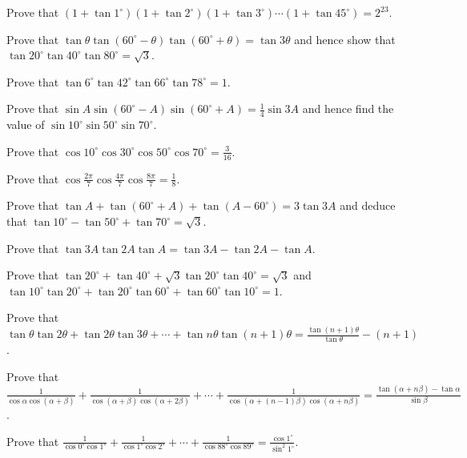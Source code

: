 \item Prove that $(1 + \tan 1^\circ)(1 + \tan 2^\circ)(1 + \tan 3^\circ)\cdots(1 + \tan 45^\circ) = 2^{23}$.

\item Prove that $\tan\theta\tan(60^\circ - \theta)\tan(60^\circ + \theta) = \tan 3\theta$ and hence show that $\tan
    20^\circ\tan 40^\circ\tan 80^\circ = \sqrt{3}$.

\item Prove that $\tan 6^\circ\tan 42^\circ\tan 66^\circ\tan 78^\circ = 1$.

\item Prove that $\sin A\sin(60^\circ - A)\sin(60^\circ + A) = \frac{1}{4}\sin 3A$ and hence find the value of $\sin
    10^\circ\sin 50^\circ\sin 70^\circ$.

\item Prove that $\cos 10^\circ\cos 30^\circ\cos 50^\circ\cos 70^\circ = \frac{3}{16}$.

\item Prove that $\cos\frac{2\pi}{7}\cos\frac{4\pi}{7}\cos\frac{8\pi}{7} = \frac{1}{8}$.

\item Prove that $\tan A + \tan(60^\circ + A) + \tan(A - 60^\circ) = 3\tan 3A$ and deduce that $\tan 10^\circ - \tan
    50^\circ + \tan 70^\circ = \sqrt{3}$.

\item Prove that $\tan 3A\tan 2A\tan A = \tan 3A - \tan 2A - \tan A$.

\item Prove that $\tan 20^\circ + \tan 40^\circ + \sqrt{3}\tan 20^\circ\tan 40^\circ = \sqrt{3}$ and $\tan 10^\circ\tan
    20^\circ + \tan 20^\circ\tan 60^\circ + \tan 60^\circ\tan 10^\circ = 1$.

\item Prove that $\tan\theta\tan 2\theta + \tan 2\theta\tan 3\theta + \cdots + \tan n\theta\tan(n + 1)\theta =
    \frac{\tan(n + 1)\theta}{\tan\theta} - (n + 1)$.

\item Prove that $\frac{1}{\cos\alpha\cos(\alpha + \beta)} + \frac{1}{\cos(\alpha + \beta)\cos(\alpha + 2\beta)} + \cdots
    + \frac{1}{\cos(\alpha + (n - 1)\beta)\cos(\alpha + n\beta)} = \frac{\tan(\alpha + n\beta) - \tan\alpha}{\sin\beta}$.

\item Prove that $\frac{1}{\cos 0^\circ\cos 1^\circ} + \frac{1}{\cos 1^\circ\cos 2^\circ} + \cdots + \frac{1}{\cos
    88^\circ\cos 89^\circ} = \frac{\cos 1^\circ}{\sin^2 1^\circ}$.

